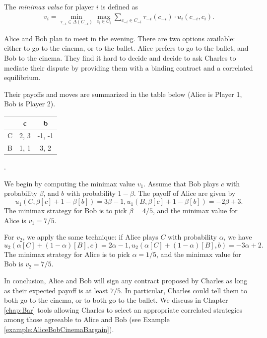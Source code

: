 \begin{definition}[Minimax]
The \emph{minimax value} for player $i$ is defined as
\begin{align*}
v_i = \min_{\tau_{-i} \in \Delta(C_{-i})} \max_{c_i \in C_i} \sum_{c_{-i} \in C_{-i}} \tau_{-i}(c_{-i}) \cdot u_i(c_{-i}, c_i).
\end{align*}
\end{definition}
\begin{example}
\label{ch5:ex:minimax}
Alice and Bob plan to meet in the evening. There are two options available: either to go to the cinema, or to the ballet.
Alice prefers to go to the ballet, and Bob to the cinema. They find it hard to decide and decide to ask Charles to mediate their dispute by providing them with a binding contract and a correlated equilibrium.

Their payoffs and moves are summarized in the table below (Alice is Player 1, Bob is Player 2).
\begin{center}
\begin{tabular}{c | c  c}
& c & b\\
\hline
C & 2, 3 & -1, -1  \\
B & 1, 1 & 3, 2
\end{tabular}
.
\end{center}

We begin by computing the minimax value $v_1$. Assume that Bob plays $c$ with probability $\beta$, and $b$ with probability $1-\beta$.
The payoff of Alice are given by
$$ u_{1}(C, \beta[c] + 1-\beta[b]) = 3\beta - 1, u_{1}(B, \beta[c] + 1-\beta[b]) = -2\beta + 3.  $$
The minimax strategy for Bob is to pick $\beta = 4/5$, and the minimax value for Alice is $v_1 = 7/5$.

For $v_2$, we apply the same technique: if Alice plays $C$ with probability $\alpha$, we have
$$ u_{2}(\alpha [C] + (1-\alpha)[B], c) = 2 \alpha - 1, u_{2}(\alpha [C] + (1-\alpha)[B], b) = -3\alpha + 2.  $$
The minimax strategy for Alice is to pick $\alpha = 1/5$, and the minimax value for Bob is $v_2 = 7/5$.

In conclusion, Alice and Bob will sign any contract proposed by Charles as long as their expected payoff is at least $7/5$. In particular, Charles could tell them to both go to the cinema, or to both go to the ballet.
We  discuss in Chapter \ref{chap:Bar} tools allowing Charles to select an appropriate correlated strategies among those agreeable to Alice and Bob (see Example \ref{example:AliceBobCinemaBargain}).

\end{example}

